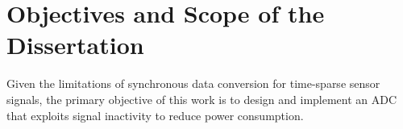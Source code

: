 
\section{Objectives and Scope of the Dissertation} \label{sec:objectives}

Given the limitations of synchronous data conversion for time-sparse sensor signals, the primary objective of this work is to design and implement an ADC that exploits signal inactivity to reduce power consumption.


